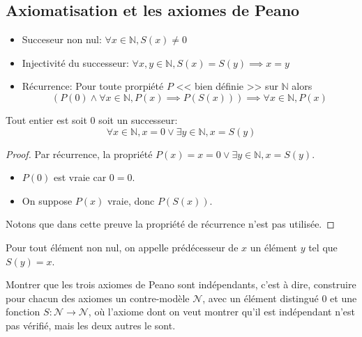 \subsection{Axiomatisation et les axiomes de Peano}

\begin{definition}
	\begin{itemize}
		\item Succeseur non nul: $\forall x \in \mathbb{N}, S(x) \neq 0$
		\item Injectivité du successeur: $\forall x,y \in \mathbb{N}, S(x) = S(y) \implies x = y$
		\item Récurrence: Pour toute prorpiété $P$ << bien définie >> sur $\mathbb{N}$ alors
		      $$ \left( P(0) \wedge \forall x \in \mathbb{N}, P(x) \implies P(S(x))\right) \implies \forall x \in \mathbb{N}, P(x) $$
	\end{itemize}
\end{definition}

\begin{lemma}
	Tout entier est soit $0$ soit un successeur:
	$$ \forall x \in \mathbb{N}, x = 0 \vee \exists y \in \mathbb{N}, x = S(y) $$
\end{lemma}

\begin{proof}
	Par récurrence, la propriété $P(x) = x = 0 \vee \exists y \in \mathbb{N}, x = S(y)$.
	\begin{itemize}
		\item $P(0)$ est vraie car $0 = 0$.
		\item On suppose $P(x)$ vraie, donc $P(S(x))$.
	\end{itemize}
	Notons que dans cette preuve la propriété de récurrence n'est pas utilisée.
\end{proof}


\begin{definition}[Prédécesseur]
	Pour tout élément non nul, on appelle prédécesseur de $x$ un élément $y$ tel que $S(y) = x$.
\end{definition}

\begin{exercice}
	Montrer que les trois axiomes de Peano sont indépendants, c'est à dire, construire pour chacun des axiomes un
	contre-modèle $\mathscr{N}$, avec un élément distingué $0$ et une fonction $S : \mathscr{N} \to \mathscr{N}$, où l’axiome dont on
	veut montrer qu’il est indépendant n’est pas vérifié, mais les deux autres le sont.
\end{exercice}
